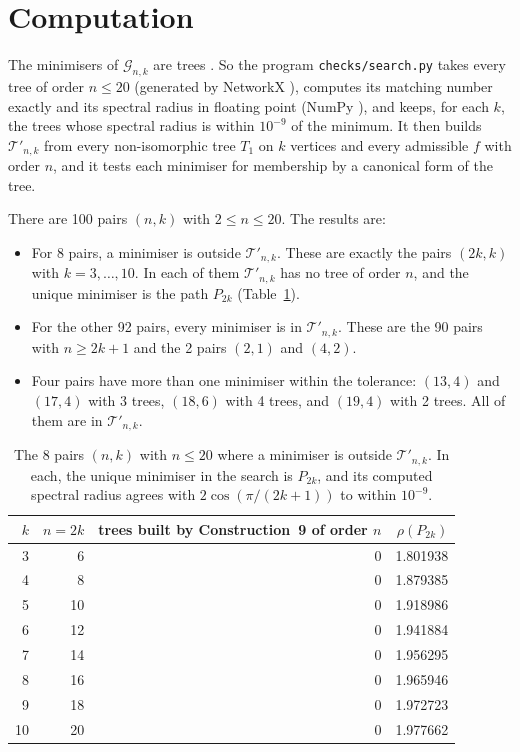 \documentclass[11pt]{article}
\theoremstyle{definition}
\newcommand{\G}{\mathcal{G}}
\newcommand{\Tp}{\mathcal{T}'}
\begin{document}
\section{Computation}\label{sec:computation}

The minimisers of $\G_{n,k}$ are trees \cite{LLT}. So the program \texttt{checks/search.py}
takes every tree of order $n \le 20$ (generated by NetworkX \cite{nx}), computes its matching number
exactly and its spectral radius in floating point (NumPy \cite{nx}), and keeps, for each $k$, the
trees whose spectral radius is within $10^{-9}$ of the minimum. It then builds
$\Tp_{n,k}$ from every non-isomorphic tree $T_1$ on $k$ vertices and every admissible
$f$ with order $n$, and it tests each minimiser for membership by a canonical form of
the tree.

There are 100 pairs $(n,k)$ with $2 \le n \le 20$. The results are:
\begin{itemize}
\item For 8 pairs, a minimiser is outside $\Tp_{n,k}$. These are exactly the pairs
$(2k,k)$ with $k = 3,\dots,10$. In each of them $\Tp_{n,k}$ has no tree of order $n$, and
the unique minimiser is the path $P_{2k}$ (Table~\ref{tab:paths}).
\item For the other 92 pairs, every minimiser is in $\Tp_{n,k}$. These are the 90 pairs
with $n \ge 2k+1$ and the 2 pairs $(2,1)$ and $(4,2)$.
\item Four pairs have more than one minimiser within the tolerance: $(13,4)$ and $(17,4)$
with 3 trees, $(18,6)$ with 4 trees, and $(19,4)$ with 2 trees. All of them are in
$\Tp_{n,k}$.
\end{itemize}

\begin{table}[ht]
\centering
\begin{tabular}{rrrr}
\toprule
$k$ & $n=2k$ & trees built by Construction~9 of order $n$ & $\rho(P_{2k})$ \\
\midrule
3 & 6 & 0 & 1.801938 \\
4 & 8 & 0 & 1.879385 \\
5 & 10 & 0 & 1.918986 \\
6 & 12 & 0 & 1.941884 \\
7 & 14 & 0 & 1.956295 \\
8 & 16 & 0 & 1.965946 \\
9 & 18 & 0 & 1.972723 \\
10 & 20 & 0 & 1.977662 \\
\bottomrule
\end{tabular}
\caption{The 8 pairs $(n,k)$ with $n \le 20$ where a minimiser is outside $\Tp_{n,k}$.
In each, the unique minimiser in the search is $P_{2k}$, and its computed spectral radius
agrees with $2\cos(\pi/(2k+1))$ to within $10^{-9}$.}
\label{tab:paths}
\end{table}
\end{document}
